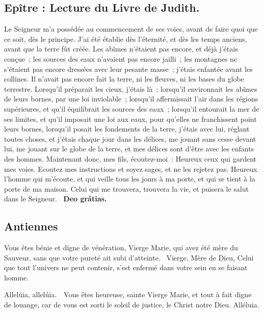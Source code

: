 \begin{multicols}{2}
{\subsection*{Epître : Lecture du Livre de Judith.}
Le Seigneur m’a possédée au commencement de ses voies, avant de faire quoi que ce soit, dès le principe. J’ai été établie dès l’éternité, et dès les temps anciens, avant que la terre fût créée. Les abîmes n’étaient pas encore, et déjà j’étais conçue ; les sources des eaux n’avaient pas encore jailli ; les montagnes ne s’étaient pas encore dressées avec leur pesante masse ; j’étais enfantée avant les collines. Il n’avait pas encore fait la terre, ni les fleuves, ni les bases du globe terrestre. Lorsqu’il préparait les cieux, j’étais là ; lorsqu’il environnait les abîmes de leurs bornes, par une loi inviolable ; lorsqu’il affermissait l’air dans les régions supérieures, et qu’il équilibrait les sources des eaux ; lorsqu’il entourait la mer de ses limites, et qu’il imposait une loi aux eaux, pour qu’elles ne franchissent point leurs bornes, lorsqu’il posait les fondements de la terre, j’étais avec lui, réglant toutes choses, et j’étais chaque jour dans les délices, me jouant sans cesse devant lui, me jouant sur le globe de la terre, et mes délices sont d’être avec les enfants des hommes. Maintenant donc, mes fils, écoutez-moi : Heureux ceux qui gardent mes voies. Ecoutez mes instructions et soyez sages, et ne les rejetez pas. Heureux l’homme qui m’écoute, et qui veille tous les jours à ma porte, et qui se tient à la porte de ma maison. Celui qui me trouvera, trouvera la vie, et puisera le salut dans le Seigneur.
\textbf{\rb\ Deo grátias.}

\subsection*{Antiennes}
Vous êtes bénie et digne de vénération, Vierge Marie, qui avez été mère du Sauveur, sans que votre pureté ait subi d’atteinte.
\vb Vierge, Mère de Dieu, Celui que tout l’univers ne peut contenir, s’est enfermé dans votre sein en se faisant homme.


Allelúia, allelúia. \vb\ Vous êtes heureuse, sainte Vierge Marie, et tout à fait digne de louange, car de vous est sorti le soleil de justice, le Christ notre Dieu. Alléluia.

}
\end{multicols}
